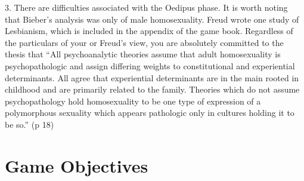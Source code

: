 3. There are difficulties associated with the Oedipus phase.
It is worth noting that Bieber's analysis was only of male homosexuality. Freud wrote one study of Lesbianism, which is included in the appendix of the game book.
Regardless of the particulars of your or Freud's view, you are absolutely committed to the thesis that
“All psychoanalytic theories assume that adult homosexuality is psychopathologic and assign differing weights to constitutional and experiential determinants. All agree that experiential determinants are in the main rooted in childhood and are primarily related to the family. Theories which do not assume psychopathology hold homosexuality to be one type of expression of a polymorphous sexuality which appears pathologic only in cultures holding it to be so.” (p 18)

\section{Game Objectives}
\label{gameobjectives}


